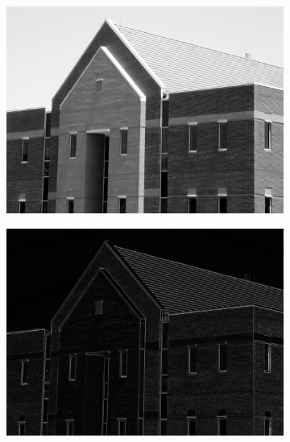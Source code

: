 \begin{figure}[h!]
	\centering
	\begin{subfigure}[b]{0.45\linewidth}
		\includegraphics[width=\linewidth]{myfigure/p9/building.png}
		\caption{}
		\label{fig:basic_building}
	\end{subfigure}
	\begin{subfigure}[b]{0.45\linewidth}
    	\includegraphics[width=\linewidth]{myfigure/p9/9_roberts.png}
    	\caption{}
    	\label{fig:roberts}
  	\end{subfigure}
  	\begin{subfigure}[b]{0.45\linewidth}

\end{subfigure}
\end{figure}
